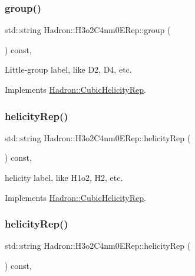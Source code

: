 \subsubsection{\texorpdfstring{group()}{group()}\hspace{0.1cm}{\footnotesize\ttfamily [2/2]}}
{\footnotesize\ttfamily std\+::string Hadron\+::\+H3o2\+C4nm0\+E\+Rep\+::group (\begin{DoxyParamCaption}{ }\end{DoxyParamCaption}) const\hspace{0.3cm}{\ttfamily [inline]}, {\ttfamily [virtual]}}

Little-\/group label, like D2, D4, etc. 

Implements \mbox{\hyperlink{structHadron_1_1CubicHelicityRep_a101a7d76cd8ccdad0f272db44b766113}{Hadron\+::\+Cubic\+Helicity\+Rep}}.

\mbox{\label{structHadron_1_1H3o2C4nm0ERep_a9e53bc16d985036a9009fab7db6347a1}} 
\subsubsection{\texorpdfstring{helicityRep()}{helicityRep()}\hspace{0.1cm}{\footnotesize\ttfamily [1/2]}}
{\footnotesize\ttfamily std\+::string Hadron\+::\+H3o2\+C4nm0\+E\+Rep\+::helicity\+Rep (\begin{DoxyParamCaption}{ }\end{DoxyParamCaption}) const\hspace{0.3cm}{\ttfamily [inline]}, {\ttfamily [virtual]}}

helicity label, like H1o2, H2, etc. 

Implements \mbox{\hyperlink{structHadron_1_1CubicHelicityRep_af1096946b7470edf0a55451cc662f231}{Hadron\+::\+Cubic\+Helicity\+Rep}}.

\mbox{\label{structHadron_1_1H3o2C4nm0ERep_a9e53bc16d985036a9009fab7db6347a1}} 
\subsubsection{\texorpdfstring{helicityRep()}{helicityRep()}\hspace{0.1cm}{\footnotesize\ttfamily [2/2]}}
{\footnotesize\ttfamily std\+::string Hadron\+::\+H3o2\+C4nm0\+E\+Rep\+::helicity\+Rep (\begin{DoxyParamCaption}{ }\end{DoxyParamCaption}) const\hspace{0.3cm}{\ttfamily [inline]}, {\ttfamily [virtual]}}

